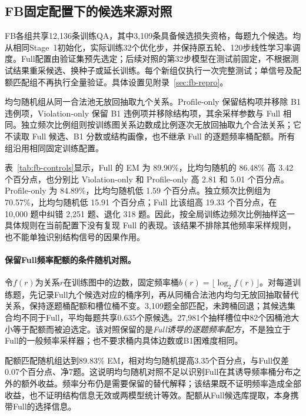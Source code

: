 

\subsection{FB固定配置下的候选来源对照}
\label{sec:fb-controls}

FB各组共享12,136条训练QA，其中3,109条具备候选损失资格，每题九个候选。均从相同Stage~1初始化，实际训练32个优化步，并保持原五轮、120步线性学习率调度。Full配置由验证集预先选定；后续对照的第32步模型在测试前固定，不根据测试结果重采候选、换种子或延长训练。每个新组仅执行一次完整测试；单信号及配额匹配组不再执行全量验证。具体设置见附录~\ref{sec:fb-repro}。

均匀随机组从同一合法池无放回抽取九个关系。Profile-only 保留结构项并移除 B1 违例项，Violation-only 保留 B1 违例项并移除结构项，其余采样参数与 Full 相同。独立频次比例组则按训练图关系边数成比例逐次无放回抽取九个合法关系；它不读取 Full 候选、B1 分数或结构画像，也不继承 Full 的逐题频率桶配额。所有组沿用相同固定训练配置。

表~\ref{tab:fb-controls}显示，Full 的 EM 为 89.90\%，比均匀随机的 86.48\% 高 3.42 个百分点，也分别比 Violation-only 和 Profile-only 高 2.81 和 5.01 个百分点。Profile-only 为 84.89\%，比均匀随机低 1.59 个百分点。独立频次比例组为 70.57\%，比均匀随机低 15.91 个百分点；Full 比该组高 19.33 个百分点，在 10,000 题中纠错 2,251 题、退化 318 题。因此，按全局训练边频次比例抽样这一具体规则在当前配置下没有复现 Full 的表现。该结果不排除其他频率采样规则，也不能单独识别结构信号的因果作用。



\paragraph{保留Full频率配额的条件随机对照。}
令$f(r)$为关系$r$在训练图中的边数，固定频率桶$b(r)=\lfloor\log_2 f(r)\rfloor$。对每道训练题，先记录Full九个候选对应的桶序列，再从同桶合法池内均匀无放回抽取替代关系，保持逐题桶配额和槽位桶不变。3,109题全部匹配，未跨桶回退；其候选集合均不同于Full，平均每题共享0.635个原候选。27,981个抽样槽位中82个因桶池大小等于配额而被迫选定。该对照保留的是\emph{Full诱导的逐题频率配方}，不是独立于Full的一般频率采样器；也不要求桶内具体边数或B1困难度相同。

配额匹配随机组达到89.83\% EM，相对均匀随机提高3.35个百分点，与Full仅差0.07个百分点、净7题。这说明均匀随机对照不足以识别Full在其诱导频率桶分布之外的额外收益。频率分布仍是需要保留的替代解释；该结果既不证明频率造成全部收益，也不证明结构信息无效或两模型统计等效。配额从Full候选库提取，本身携带Full的选择信息。

